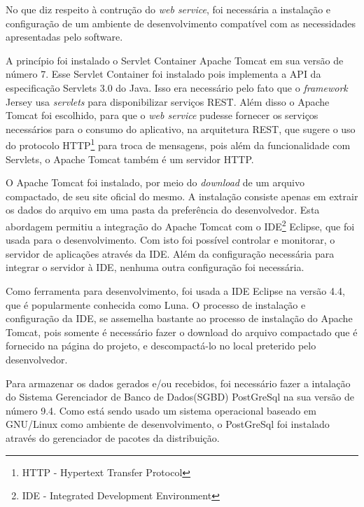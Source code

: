 	
	\par No que diz respeito à contrução do \textit{web service}, foi necessária a
instalação e configuração de um ambiente de desenvolvimento compatível com as
necessidades apresentadas pelo software.

	\par A princípio foi instalado o Servlet Container Apache Tomcat em sua versão
de número {7}. Esse Servlet Container foi instalado pois implementa a API da
especificação Servlets {3.0} do Java. Isso era necessário pelo fato que o
\textit{framework} Jersey usa \textit{servlets} para disponibilizar serviços
REST. Além disso o Apache Tomcat foi escolhido, para que o \textit{web service}
pudesse fornecer os serviços necessários para o consumo do aplicativo, na
arquitetura REST, que sugere o uso do protocolo HTTP\footnote{HTTP - Hypertext
Transfer Protocol} para troca de mensagens, pois além da funcionalidade com
Servlets, o Apache Tomcat também é um servidor HTTP.
	
	\par O Apache Tomcat foi instalado, por meio do \textit{download} de um
arquivo compactado, de seu site oficial do mesmo. A instalação consiste apenas
em extrair os dados do arquivo em uma pasta da preferência do desenvolvedor.
Esta abordagem permitiu a integração do Apache Tomcat com o
IDE\footnote{IDE - Integrated Development Environment}
Eclipse, que foi usada para o desenvolvimento. Com isto foi possível controlar
e monitorar, o servidor de aplicações através da IDE. Além da configuração
necessária para integrar o servidor à IDE, nenhuma outra configuração foi
necessária.

	\par Como ferramenta para desenvolvimento, foi usada a IDE Eclipse na versão
{4.4}, que é popularmente conhecida como Luna. O processo de instalação e
configuração da IDE, se assemelha bastante ao processo de instalação do Apache
Tomcat, pois somente é necessário fazer o download do arquivo compactado que é
fornecido na página do projeto, e descompactá-lo no local preterido pelo
desenvolvedor.

	\par Para armazenar os dados gerados e/ou recebidos, foi necessário fazer a
intalação do Sistema Gerenciador de Banco de Dados(SGBD) PostGreSql na sua
versão de número {9.4}. Como está sendo usado um sistema operacional baseado em
GNU/Linux como ambiente de desenvolvimento, o PostGreSql foi instalado através
do gerenciador de pacotes da distribuição.
 
